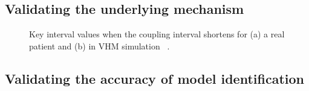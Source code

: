 \subsection{Validating the underlying mechanism}


\begin{figure}[!t]
\centering
\label{fig:Case_1}
\caption{\small Key interval values when the coupling interval shortens for (a) a real patient and (b) in VHM simulation ~\cite{vhm_ecrts10}.}
\end{figure} 

\subsection{Validating the accuracy of model identification}


